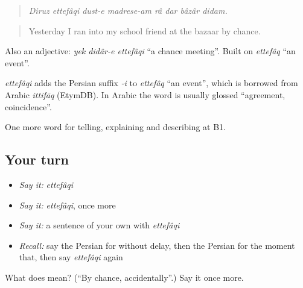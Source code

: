 \begin{quote}
\emph{Diruz ettefâqi dust-e madrese-am râ dar bâzâr didam.}
\end{quote}

\begin{quote}
Yesterday I ran into my school friend at the bazaar by chance.
\end{quote}

Also an adjective: \emph{yek didâr-e ettefâqi} \textquotedblleft{}a chance meeting\textquotedblright{}. Built on \emph{ettefâq} \textquotedblleft{}an event\textquotedblright{}.

\begin{cousinweb}
\emph{ettefâqi} adds the Persian suffix \emph{-i} to \emph{ettefâq} \textquotedblleft{}an event\textquotedblright{}, which is borrowed from Arabic \emph{ittifāq} (EtymDB). In Arabic the word is usually glossed \textquotedblleft{}agreement, coincidence\textquotedblright{}.
\end{cousinweb}

\begin{grammarlens}[title={What you've built}]
One more word for telling, explaining and describing at B1.
\end{grammarlens}

\subsection*{Your turn}
\begin{itemize}
\raggedright
  \item \emph{Say it:} \emph{ettefâqi}
  \item \emph{Say it:} \emph{ettefâqi}, once more
  \item \emph{Say it:} a sentence of your own with \emph{ettefâqi}
  \item \emph{Recall:} say the Persian for without delay, then the Persian for the moment that, then say \emph{ettefâqi} again
\end{itemize}

\begin{tcolorbox}[breakable,colback=teal!4,colframe=teal!35!black,title={Before you move on}]
What does  mean? (\textquotedblleft{}By chance, accidentally\textquotedblright{}.) Say it once more.
\end{tcolorbox}
